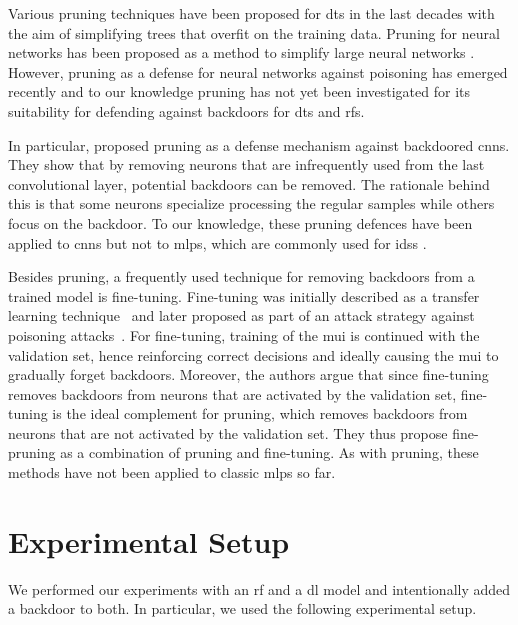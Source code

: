 \documentclass[10pt,sigconf,letterpaper,dvipsnames]{acmart}
\newcommand\note[2]{{\color{#1}#2}}
\newcommand\todo[1]{{\note{red}{TODO: #1}}}
\begin{document}
Various pruning techniques have been proposed for \glspl{dt} in the last decades \cite{esposito_comparative_1997} with the aim of simplifying trees that overfit on the training data. Pruning for neural networks has been proposed
as a method to simplify large neural networks \cite{sietsma_neural_1988}.
However, pruning as a defense for neural networks against poisoning has emerged recently \cite{gu_badnets:_2017} and to our knowledge pruning has not yet been investigated for its suitability for defending against backdoors for \glspl{dt} and \glspl{rf}.

In particular, \cite{gu_badnets:_2017} proposed pruning as a defense mechanism against backdoored \glspl{cnn}. They show that by removing neurons that are infrequently used from the last convolutional layer, potential backdoors can be removed. The rationale behind this is that some neurons specialize processing the regular samples while others focus on the backdoor. To our knowledge, these pruning defences have been applied to \glspl{cnn} but not to \glspl{mlp}, which are commonly used for \glspl{ids} \cite{meghdouri_analysis_2018}.

Besides pruning, a frequently used technique for removing backdoors from a trained model is fine-tuning. Fine-tuning was initially described as a transfer learning technique~\cite{yosinski_how_2014} and later proposed as part of an attack strategy against poisoning attacks~\cite{liu_fine-pruning:_2018}. For fine-tuning, training of the \gls{mui} is continued with the validation set, hence reinforcing correct decisions and ideally causing the \gls{mui} to gradually forget backdoors. Moreover, the authors argue that since fine-tuning removes backdoors from neurons that are activated by the validation set, fine-tuning is the ideal complement for pruning, which removes backdoors from neurons that are not activated by the validation set. They thus propose fine-pruning as a combination of pruning and fine-tuning. As with pruning, these methods have not been applied to classic \glspl{mlp} so far. 

\section{Experimental Setup} \label{sec:ml_approaches}
We performed our experiments with an \gls{rf} and a \gls{dl} model and intentionally added a backdoor to both. In particular, we used the following experimental setup.
\end{document}
